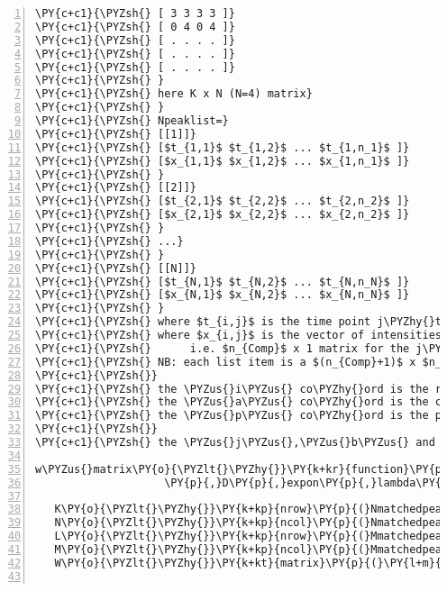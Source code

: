\begin{Verbatim}[commandchars=\\\{\},codes={\catcode`\$=3\catcode`\^=7\catcode`\_=8},gobble=0,numbers=left,fontfamily=fvm,fontshape=n,fontsize=\footnotesize,tabsize=2]
\PY{c+c1}{\PYZsh{} [ 3 3 3 3 ]}
\PY{c+c1}{\PYZsh{} [ 0 4 0 4 ]}
\PY{c+c1}{\PYZsh{} [ . . . . ]}
\PY{c+c1}{\PYZsh{} [ . . . . ]}
\PY{c+c1}{\PYZsh{} [ . . . . ]}
\PY{c+c1}{\PYZsh{} }
\PY{c+c1}{\PYZsh{} here K x N (N=4) matrix}
\PY{c+c1}{\PYZsh{} }
\PY{c+c1}{\PYZsh{} Npeaklist=}
\PY{c+c1}{\PYZsh{} [[1]]}
\PY{c+c1}{\PYZsh{} [$t_{1,1}$ $t_{1,2}$ ... $t_{1,n_1}$ ]}
\PY{c+c1}{\PYZsh{} [$x_{1,1}$ $x_{1,2}$ ... $x_{1,n_1}$ ]}
\PY{c+c1}{\PYZsh{} }
\PY{c+c1}{\PYZsh{} [[2]]}
\PY{c+c1}{\PYZsh{} [$t_{2,1}$ $t_{2,2}$ ... $t_{2,n_2}$ ]}
\PY{c+c1}{\PYZsh{} [$x_{2,1}$ $x_{2,2}$ ... $x_{2,n_2}$ ]}
\PY{c+c1}{\PYZsh{} }
\PY{c+c1}{\PYZsh{} ...}
\PY{c+c1}{\PYZsh{} }
\PY{c+c1}{\PYZsh{} [[N]]}
\PY{c+c1}{\PYZsh{} [$t_{N,1}$ $t_{N,2}$ ... $t_{N,n_N}$ ]}
\PY{c+c1}{\PYZsh{} [$x_{N,1}$ $x_{N,2}$ ... $x_{N,n_N}$ ]}
\PY{c+c1}{\PYZsh{} }
\PY{c+c1}{\PYZsh{} where $t_{i,j}$ is the time point j\PYZhy{}th peak for the i\PYZhy{}th spectrum}
\PY{c+c1}{\PYZsh{} where $x_{i,j}$ is the vector of intensities ($n_{Comp}$ long)  }
\PY{c+c1}{\PYZsh{}      i.e. $n_{Comp}$ x 1 matrix for the j\PYZhy{}th peak for the i\PYZhy{}th spectrum}
\PY{c+c1}{\PYZsh{} NB: each list item is a $(n_{Comp}+1)$ x $n_N$ matrix}
\PY{c+c1}{\PYZsh{}}
\PY{c+c1}{\PYZsh{} the \PYZus{}i\PYZus{} co\PYZhy{}ord is the row in the Nmatchedpeaks}
\PY{c+c1}{\PYZsh{} the \PYZus{}a\PYZus{} co\PYZhy{}ord is the column number of Nmatchedpeaks (the spectrum number)}
\PY{c+c1}{\PYZsh{} the \PYZus{}p\PYZus{} co\PYZhy{}ord is the peak number for the \PYZus{}a\PYZus{}th spectrum}
\PY{c+c1}{\PYZsh{}}
\PY{c+c1}{\PYZsh{} the \PYZus{}j\PYZus{},\PYZus{}b\PYZus{} and \PYZus{}q\PYZus{} co\PYZhy{}ords are defined similarly for the M\PYZhy{}alignment}

w\PYZus{}matrix\PY{o}{\PYZlt{}\PYZhy{}}\PY{k+kr}{function}\PY{p}{(}Nmatchedpeaks\PY{p}{,}Npeaklists\PY{p}{,}Mmatchedpeaks\PY{p}{,}Mpeaklists
					\PY{p}{,}D\PY{p}{,}expon\PY{p}{,}lambda\PY{p}{)}\PY{p}{\PYZob{}}

   K\PY{o}{\PYZlt{}\PYZhy{}}\PY{k+kp}{nrow}\PY{p}{(}Nmatchedpeaks\PY{p}{)}
   N\PY{o}{\PYZlt{}\PYZhy{}}\PY{k+kp}{ncol}\PY{p}{(}Nmatchedpeaks\PY{p}{)}
   L\PY{o}{\PYZlt{}\PYZhy{}}\PY{k+kp}{nrow}\PY{p}{(}Mmatchedpeaks\PY{p}{)}
   M\PY{o}{\PYZlt{}\PYZhy{}}\PY{k+kp}{ncol}\PY{p}{(}Mmatchedpeaks\PY{p}{)}
   W\PY{o}{\PYZlt{}\PYZhy{}}\PY{k+kt}{matrix}\PY{p}{(}\PY{l+m}{0}\PY{p}{,}nrow\PY{o}{=}K\PY{p}{,}ncol\PY{o}{=}L\PY{p}{)}
   

\end{Verbatim}
